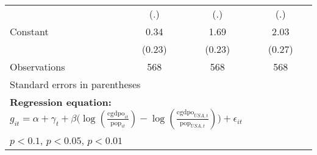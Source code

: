 \begin{table}[htbp]
\begin{tabular}{l*{3}{c}}
                &      (.)         &      (.)         &      (.)         \\
\addlinespace
Constant        &     0.34         &     1.69\sym{***}&     2.03\sym{***}\\
                &   (0.23)         &   (0.23)         &   (0.27)         \\
\midrule
Observations    &      568         &      568         &      568         \\
\bottomrule
\multicolumn{4}{l}{\footnotesize Standard errors in parentheses}\\
\multicolumn{4}{l}{\footnotesize \textbf{Regression equation:} \(g_{it} = \alpha + \gamma_t + \beta \big(\log (\frac{\textrm{cgdpo}_{it}}{\textrm{pop}_{it}} ) - \log (\frac{\textrm{cgdpo}_{USA,t}}{\textrm{pop}_{USA,t}}  ) \big) + \epsilon_{it}\)}\\
\multicolumn{4}{l}{\footnotesize \sym{*} \(p<0.1\), \sym{**} \(p<0.05\), \sym{***} \(p<0.01\)}\\
\end{tabular}
\end{table}
